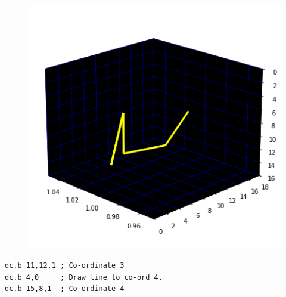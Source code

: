 \begin{minipage}[c]{0.48\linewidth}
\begin{figure}[H]
    \centering
    \begin{adjustbox}{width=5.5cm,center}
      \includegraphics[width=12cm]{src/claws/build_claw_3_0.png}%
    \end{adjustbox}
\end{figure}
\end{minipage}
\begin{minipage}[c]{0.48\linewidth}
\begin{lstlisting}[basicstyle=\scriptsize\ttfamily]
dc.b 11,12,1 ; Co-ordinate 3
dc.b 4,0     ; Draw line to co-ord 4.
dc.b 15,8,1  ; Co-ordinate 4
\end{lstlisting}
\vspace*{\fill}
\end{minipage}

